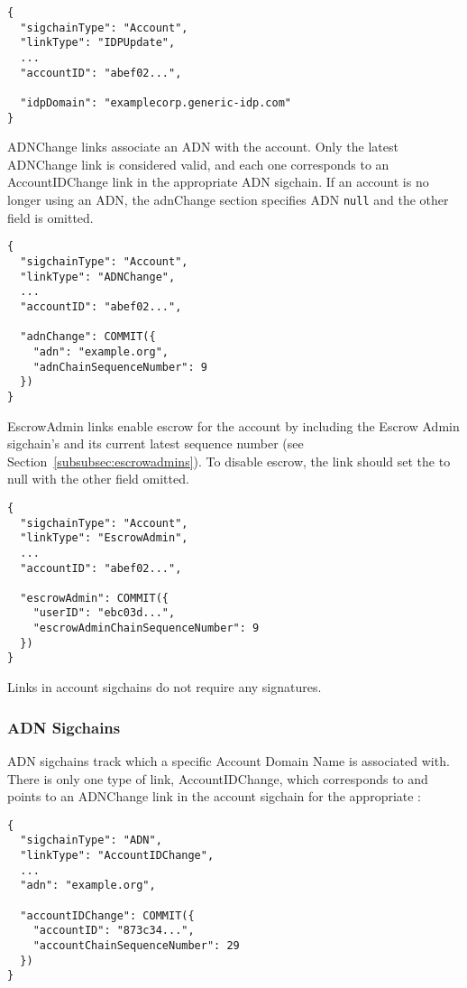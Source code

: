 \begin{Verbatim}
{
  "sigchainType": "Account",
  "linkType": "IDPUpdate",
  ...
  "accountID": "abef02...",

  "idpDomain": "examplecorp.generic-idp.com"
}
\end{Verbatim}

\textsf{ADNChange} links associate an ADN with the account. Only the latest \textsf{ADNChange} link
is considered valid, and each one corresponds to an \textsf{AccountIDChange} link in the appropriate
ADN sigchain. If an account is no longer using an ADN, the \textsf{adnChange} section specifies ADN
\texttt{null} and the other field is omitted.

\begin{Verbatim}
{
  "sigchainType": "Account",
  "linkType": "ADNChange",
  ...
  "accountID": "abef02...",

  "adnChange": COMMIT({
    "adn": "example.org",
    "adnChainSequenceNumber": 9
  })
}
\end{Verbatim}

\textsf{EscrowAdmin} links enable escrow for the account by including the Escrow Admin sigchain's
{\userID} and its current latest sequence number (see Section~\ref{subsubsec:escrowadmins}). To
disable escrow, the link should set the {\userID} to null with the other field omitted.

\begin{Verbatim}
{
  "sigchainType": "Account",
  "linkType": "EscrowAdmin",
  ...
  "accountID": "abef02...",

  "escrowAdmin": COMMIT({
    "userID": "ebc03d...",
    "escrowAdminChainSequenceNumber": 9
  })
}
\end{Verbatim}

Links in account sigchains do not require any signatures.

\subsubsection{ADN Sigchains}

ADN sigchains track which \accountID a specific Account Domain Name is associated with. There is
only one type of link, \textsf{AccountIDChange}, which corresponds to and points to an
\textsf{ADNChange} link in the account sigchain for the appropriate \accountID:

\begin{Verbatim}
{
  "sigchainType": "ADN",
  "linkType": "AccountIDChange",
  ...
  "adn": "example.org",

  "accountIDChange": COMMIT({
    "accountID": "873c34...",
    "accountChainSequenceNumber": 29
  })
}
\end{Verbatim}

